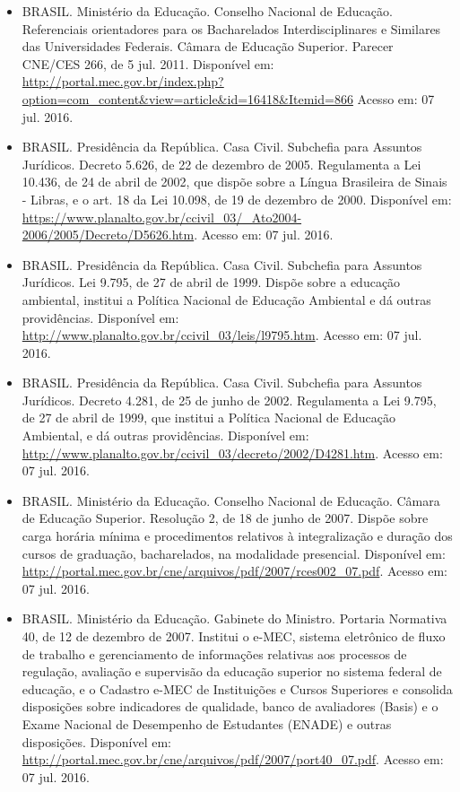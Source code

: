 \begin{itemize}
    \item BRASIL. Ministério da Educação. Conselho Nacional de Educação.
    Referenciais orientadores para os Bacharelados Interdisciplinares e
    Similares das Universidades Federais. Câmara de Educação Superior. Parecer
    CNE/CES 266, de 5 jul. 2011. Disponível em:
    \url{http://portal.mec.gov.br/index.php?option=com_content&view=article&id=16418&Itemid=866}
    Acesso em: 07 jul. 2016.
    
    \item BRASIL. Presidência da República. Casa Civil. Subchefia para Assuntos
    Jurídicos. Decreto 5.626, de 22 de dezembro de 2005. Regulamenta a Lei
    10.436, de 24 de abril de 2002, que dispõe sobre a Língua Brasileira de
    Sinais - Libras, e o art. 18 da Lei 10.098, de 19 de dezembro de 2000.
    Disponível em:
    \url{https://www.planalto.gov.br/ccivil_03/_Ato2004-2006/2005/Decreto/D5626.htm}.
    Acesso em: 07 jul. 2016.
    
    \item  BRASIL. Presidência da República. Casa Civil. Subchefia para
    Assuntos Jurídicos. Lei 9.795, de 27 de abril de 1999. Dispõe sobre a
    educação ambiental, institui a Política Nacional de Educação Ambiental e dá
    outras providências. Disponível em:
    \url{http://www.planalto.gov.br/ccivil_03/leis/l9795.htm}. Acesso em: 07
    jul. 2016.
    
    \item BRASIL. Presidência da República. Casa Civil. Subchefia para Assuntos
    Jurídicos. Decreto 4.281, de 25 de junho de 2002. Regulamenta a Lei 9.795,
    de 27 de abril de 1999, que institui a Política Nacional de Educação
    Ambiental, e dá outras providências. Disponível em:
    \url{http://www.planalto.gov.br/ccivil_03/decreto/2002/D4281.htm}. Acesso
    em: 07 jul. 2016.
    
    \item BRASIL. Ministério da Educação. Conselho Nacional de Educação. Câmara
    de Educação Superior. Resolução 2, de 18 de junho de 2007. Dispõe sobre
    carga horária mínima e procedimentos relativos à integralização e duração
    dos cursos de graduação, bacharelados, na modalidade presencial. Disponível
    em: \url{http://portal.mec.gov.br/cne/arquivos/pdf/2007/rces002_07.pdf}.
    Acesso em: 07 jul. 2016.
    
    \item BRASIL. Ministério da Educação. Gabinete do Ministro. Portaria
    Normativa 40, de 12 de dezembro de 2007. Institui o e-MEC, sistema
    eletrônico de fluxo de trabalho e gerenciamento de informações relativas
    aos processos de regulação, avaliação e supervisão da educação superior no
    sistema federal de educação, e o Cadastro e-MEC de Instituições e Cursos
    Superiores e consolida disposições sobre indicadores de qualidade, banco de
    avaliadores (Basis) e o Exame Nacional de Desempenho de Estudantes (ENADE)
    e outras disposições. Disponível em:
    \url{http://portal.mec.gov.br/cne/arquivos/pdf/2007/port40_07.pdf}. Acesso
    em: 07 jul. 2016.
    

\end{itemize}
